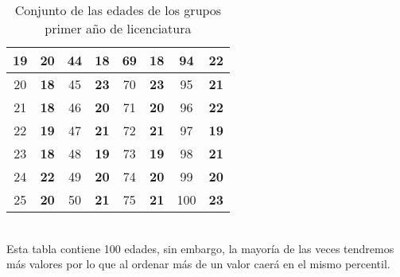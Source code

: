 \documentclass{article}
\begin{document}
\begin{table}[h!]
\begin{tabular}{|c|c|c|c|c|c|c|c|}
    19 & \textbf{20} & 44 & \textbf{18} & 69 & \textbf{18} & 94 & \textbf{22} \\ \hline
    20 & \textbf{18} & 45 & \textbf{23} & 70 & \textbf{23} & 95 & \textbf{21} \\ \hline
    21 & \textbf{18} & 46 & \textbf{20} & 71 & \textbf{20} & 96 & \textbf{22} \\ \hline
    22 & \textbf{19} & 47 & \textbf{21} & 72 & \textbf{21} & 97 & \textbf{19} \\ \hline
    23 & \textbf{18} & 48 & \textbf{19} & 73 & \textbf{19} & 98 & \textbf{21} \\ \hline
    24 & \textbf{22} & 49 & \textbf{20} & 74 & \textbf{20} & 99 & \textbf{20} \\ \hline
    25 & \textbf{20} & 50 & \textbf{21} & 75 & \textbf{21} & 100 & \textbf{23} \\ \hline
    \end{tabular}
    \caption{Conjunto de las edades de los grupos primer año de licenciatura}
\end{table}
\\
Esta tabla contiene 100 edades, sin embargo, la mayoría de las veces tendremos más valores por lo que al ordenar más de un valor caerá en el mismo percentil.

\clearpage
\end{document}
